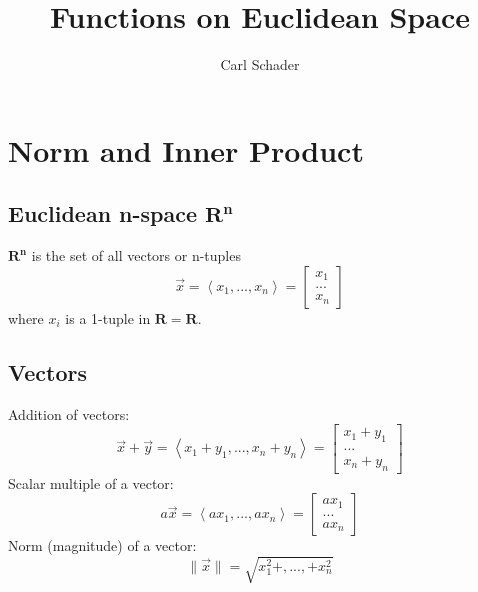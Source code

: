 \documentclass{article}
\title{Functions on Euclidean Space}
\author{Carl Schader}
\date{}
\begin{document}
	\maketitle
	\tableofcontents
	\newpage
	
	\section{Norm and Inner Product}

	\subsection{Euclidean n-space $\mathbf{R^n}$}
	$\mathbf{R^n}$ is the set of all vectors or n-tuples
	\begin{equation*}
		\vec{x} = \left<x_1, ..., x_n\right> = 
		\left[\begin{matrix}
			x_1\\
			...\\
			x_n
		\end{matrix}\right]
	\end{equation*}
	where $x_i$ is a 1-tuple in $\mathbf{R} = \mathbf{R}$.

	\subsection{Vectors}
	Addition of vectors:
	\begin{equation*}
		\vec{x} + \vec{y} = \left<x_1 + y_1, ..., x_n + y_n\right> = 
		\left[\begin{matrix}
			x_1 + y_1\\
			...\\
			x_n + y_n
		\end{matrix}\right]
	\end{equation*}
	Scalar multiple of a vector:
	\begin{equation*}
		a\vec{x} = \left<ax_1, ..., ax_n\right> =
		\left[\begin{matrix}
			ax_1\\
			...\\
			ax_n
		\end{matrix}\right]
	\end{equation*}
	Norm (magnitude) of a vector:
	\begin{equation*}
		\lVert\vec{x}\rVert = \sqrt{x_1^2 +, ..., + x_n^2}
	\end{equation*}	
	
\end{document}
